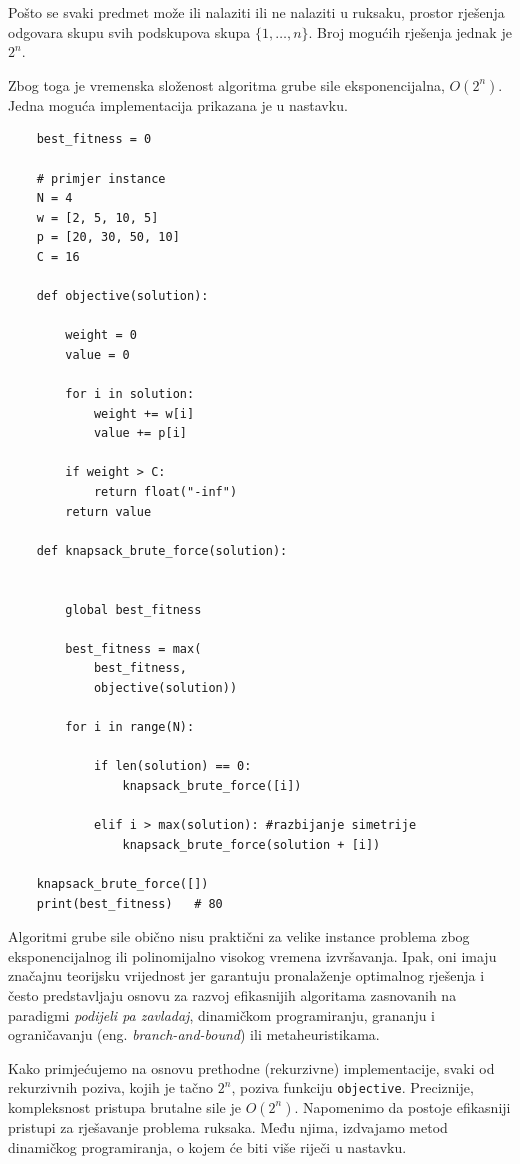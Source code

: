 Pošto se svaki predmet može ili nalaziti ili ne nalaziti u ruksaku, prostor rješenja odgovara skupu svih podskupova skupa $\{1,\ldots,n\}$. Broj mogućih rješenja jednak je $2^n.$

Zbog toga je vremenska složenost algoritma grube sile eksponencijalna, $O(2^n).$\\

Jedna moguća implementacija prikazana je u nastavku.

\begin{verbatim}
	best_fitness = 0
	
	# primjer instance
	N = 4
	w = [2, 5, 10, 5]
	p = [20, 30, 50, 10]
	C = 16
	
	def objective(solution):
	
 	    weight = 0
	    value = 0
	
	    for i in solution:
	        weight += w[i]
	        value += p[i]
	
	    if weight > C:
	        return float("-inf")
	    return value
	
	def knapsack_brute_force(solution):
	
	
	    global best_fitness
	    
	    best_fitness = max(
	        best_fitness,
	        objective(solution))
	
	    for i in range(N):
	
	        if len(solution) == 0:
	            knapsack_brute_force([i])
	
	        elif i > max(solution): #razbijanje simetrije
	            knapsack_brute_force(solution + [i])
	
	knapsack_brute_force([])
	print(best_fitness)   # 80
\end{verbatim}

Algoritmi grube sile obično nisu praktični za velike instance problema zbog eksponencijalnog ili polinomijalno visokog vremena izvršavanja. Ipak, oni imaju značajnu teorijsku vrijednost jer garantuju pronalaženje optimalnog rješenja i često predstavljaju osnovu za razvoj efikasnijih algoritama zasnovanih na paradigmi \emph{podijeli pa zavladaj}, dinamičkom programiranju, grananju i ograničavanju (eng. \emph{branch-and-bound}) ili metaheuristikama.


Kako primjećujemo na osnovu prethodne (rekurzivne) implementacije, svaki od  
rekurzivnih poziva, kojih je tačno $2^n$, poziva funkciju \texttt{objective}. Preciznije, kompleksnost pristupa brutalne sile je $O(2^n)$. Napomenimo da postoje efikasniji pristupi za rješavanje problema ruksaka. Među njima, izdvajamo metod dinamičkog programiranja, o kojem će biti više riječi u nastavku.


